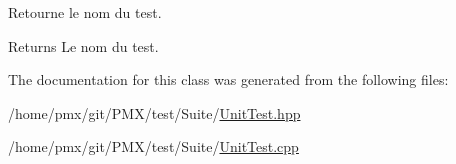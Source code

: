Retourne le nom du test. 

\begin{DoxyReturn}{Returns}
Le nom du test. 
\end{DoxyReturn}


The documentation for this class was generated from the following files\+:\begin{DoxyCompactItemize}
\item 
/home/pmx/git/\+P\+M\+X/test/\+Suite/\hyperlink{UnitTest_8hpp}{Unit\+Test.\+hpp}\item 
/home/pmx/git/\+P\+M\+X/test/\+Suite/\hyperlink{UnitTest_8cpp}{Unit\+Test.\+cpp}\end{DoxyCompactItemize}
